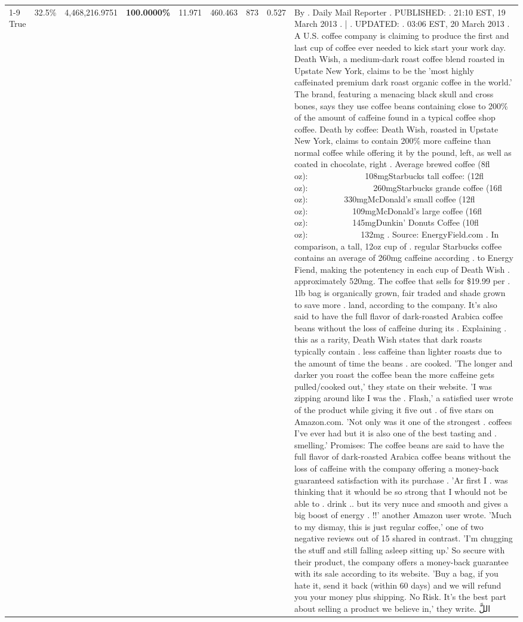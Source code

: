 \begin{table}[H]
{\begin{tabular}{lllrlllll}
\cline{1-9}
True & 32.5\% & 4,468,216.9751 & \bfseries \color{red} 100.0000\% & 11.971 & 460.463 & 873 & 0.527 & By . Daily Mail Reporter . PUBLISHED: . 21:10 EST, 19 March 2013 . | . UPDATED: . 03:06 EST, 20 March 2013 . A U.S. coffee company is claiming to produce the first and last cup of coffee ever needed to kick start your work day. Death Wish, a medium-dark roast coffee blend roasted in Upstate New York, claims to be the 'most highly caffeinated premium dark roast organic coffee in the world.' The brand, featuring a menacing black skull and cross bones, says they use coffee beans containing close to 200\% of the amount of caffeine found in a typical coffee shop coffee. Death by coffee: Death Wish, roasted in Upstate New York, claims to contain 200\% more caffeine than normal coffee while offering it by the pound, left, as well as coated in chocolate, right . Average brewed coffee (8fl oz):              108mgStarbucks tall coffee: (12fl oz):                260mgStarbucks grande coffee (16fl oz):         330mgMcDonald's small coffee (12fl oz):           109mgMcDonald's large coffee (16fl oz):           145mgDunkin' Donuts Coffee (10fl oz):             132mg . Source: EnergyField.com . In comparison, a tall, 12oz cup of . regular Starbucks coffee contains an average of 260mg caffeine according . to Energy Fiend, making the potentency in each cup of Death Wish . approximately 520mg. The coffee that sells for \$19.99 per . 1lb bag is organically grown, fair traded and shade grown to save more . land, according to the company. It's also said to have the full flavor of dark-roasted Arabica coffee beans without the loss of caffeine during its . Explaining . this as a rarity, Death Wish states that dark roasts typically contain . less caffeine than lighter roasts due to the amount of time the beans . are cooked. 'The longer and darker you roast the coffee bean the more caffeine gets pulled/cooked out,' they state on their website. 'I was zipping around like I was the . Flash,' a satisfied user wrote of the product while giving it five out . of five stars on Amazon.com. 'Not only was it one of the strongest . coffees I've ever had but it is also one of the best tasting and . smelling.’ Promises: The coffee beans are said to have the full flavor of dark-roasted Arabica coffee beans without the loss of caffeine with the company offering a money-back guaranteed satisfaction with its purchase . 'Ar first I . was thinking that it whould be so strong that I whould not be able to . drink .. but its very nuce and smooth and gives a big boost of energy . !!' another Amazon user wrote. 'Much to my dismay, this is just regular coffee,' one of two negative reviews out of 15 shared in contrast. 'I'm chugging the stuff and still falling asleep sitting up.' So secure with their product, the company offers a money-back guarantee with its sale according to its website. 'Buy a bag, if you hate it, send it back (within 60 days) and we will refund you your money plus shipping. No Risk. It’s the best part about selling a product we believe in,' they write. اللَّ \\

\end{tabular}}
\end{table}

